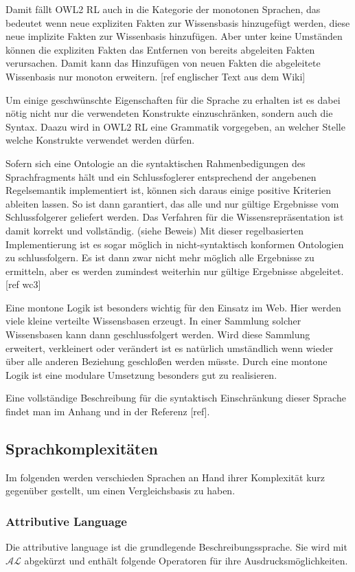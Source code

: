 Damit fällt OWL2 RL auch in die Kategorie der monotonen Sprachen, das bedeutet wenn neue expliziten Fakten zur Wissensbasis hinzugefügt werden, diese neue implizite Fakten zur Wissenbasis hinzufügen. Aber unter keine Umständen können die expliziten Fakten das Entfernen von bereits abgeleiten Fakten verursachen. Damit kann das Hinzufügen von neuen Fakten die abgeleitete Wissenbasis nur monoton erweitern. [ref englischer Text aus dem Wiki]

Um einige geschwünschte Eigenschaften für die Sprache zu erhalten ist es dabei nötig nicht nur die verwendeten Konstrukte einzuschränken, sondern auch die Syntax. Daazu wird in OWL2 RL eine Grammatik vorgegeben, an welcher Stelle welche Konstrukte verwendet werden dürfen.

Sofern sich eine Ontologie an die syntaktischen Rahmenbedigungen des Sprachfragments hält und ein Schlussfoglerer entsprechend der angebenen Regelsemantik implementiert ist, können sich daraus einige positive Kriterien ableiten lassen. So ist dann garantiert, das alle und nur gültige Ergebnisse vom Schlussfolgerer geliefert werden. Das Verfahren für die Wissensrepräsentation ist damit korrekt und vollständig. (siehe Beweis)
Mit dieser regelbasierten Implementierung ist es sogar möglich in nicht-syntaktisch konformen Ontologien zu schlussfolgern. Es ist dann zwar nicht mehr möglich alle Ergebnisse zu ermitteln, aber es werden zumindest weiterhin nur gültige Ergebnisse abgeleitet. [ref wc3]

Eine montone Logik ist besonders wichtig für den Einsatz im Web. Hier werden viele kleine verteilte Wissensbasen erzeugt. In einer Sammlung solcher Wissensbasen kann dann geschlussfolgert werden. Wird diese Sammlung erweitert, verkleinert oder verändert ist es natürlich umständlich wenn wieder über alle anderen Beziehung geschloßen werden müsste. Durch eine montone Logik ist eine modulare Umsetzung besonders gut zu realisieren.

Eine vollständige Beschreibung für die syntaktisch Einschränkung dieser Sprache findet man im Anhang und in der Referenz [ref].

\subsection{Sprachkomplexitäten}
Im folgenden werden verschieden Sprachen an Hand ihrer Komplexität kurz gegenüber gestellt, um einen Vergleichsbasis zu haben.

\subsubsection{Attributive Language}
Die attributive language ist die grundlegende Beschreibungssprache. Sie wird mit $\mathcal{AL}$ abgekürzt und enthält folgende Operatoren für ihre Ausdrucksmöglichkeiten.

